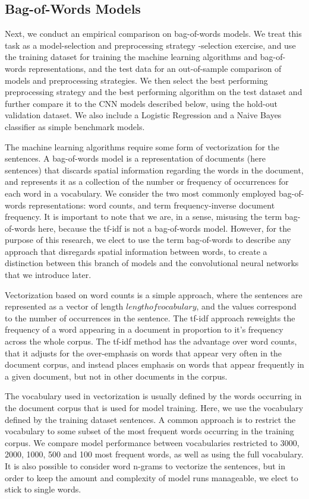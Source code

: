 \documentclass[conference]{IEEEtran}
\begin{document}
\subsection{Bag-of-Words Models}

Next, we conduct an empirical comparison on bag-of-words models. We treat this task as a model-selection and preprocessing strategy -selection exercise, and use the training dataset for training the machine learning algorithms and bag-of-words representations, and the test data for an out-of-sample comparison of models and preprocessing strategies. We then select the best performing preprocessing strategy and the best performing algorithm on the test dataset and further compare it to the CNN models described below, using the hold-out validation dataset. We also include a Logistic Regression and a Naive Bayes classifier as simple benchmark models.

The machine learning algorithms require some form of vectorization for the sentences. A bag-of-words model is a representation of documents (here sentences) that discards spatial information regarding the words in the document, and represents it as a collection of the number or frequency of occurrences for each word in a vocabulary. We consider the two most commonly employed bag-of-words representations: word counts\cite{luhn}, and term frequency-inverse document frequency\cite{tfidf}. It is important to note that we are, in a sense, misusing the term bag-of-words here, because the tf-idf is not a bag-of-words model. However, for the purpose of this research, we elect to use the term bag-of-words to describe any approach that disregards spatial information between words, to create a distinction between this branch of models and the convolutional neural networks that we introduce later.

Vectorization based on word counts is a simple approach, where the sentences are represented as a vector of length $length of vocabulary$, and the values correspond to the number of occurrences in the sentence. The tf-idf approach reweights the frequency of a word appearing in a document in proportion to it's frequency across the whole corpus. The tf-idf method has the advantage over word counts, that it adjusts for the over-emphasis on words that appear very often in the document corpus, and instead places emphasis on words that appear frequently in a given document, but not in other documents in the corpus.

The vocabulary used in vectorization is usually defined by the words occurring in the document corpus that is used for model training. Here, we use the vocabulary defined by the training dataset sentences. A common approach is to  restrict the vocabulary to some subset of the most frequent words occurring in the training corpus. We compare model performance between vocabularies restricted to 3000, 2000, 1000, 500 and 100 most frequent words, as well as using the full vocabulary. It is also possible to consider word n-grams to vectorize the sentences, but in order to keep the amount and complexity of model runs manageable, we elect to stick to single words.
\end{document}
